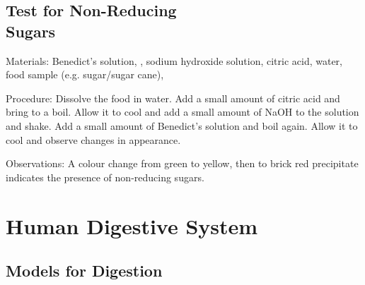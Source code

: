 \begin{multicols}{2}
\subsection[Test for Non-Reducing Sugars]{Test for Non-Reducing \hfill \\ Sugars}


\begin{description*}
\item[Materials:]{Benedict's solution, , sodium hydroxide solution, citric acid, water, food sample (e.g. sugar/sugar cane), }
\item[Procedure:]{Dissolve the food in water. Add a small amount of citric acid and bring to a boil. Allow it to cool and add a small amount of NaOH to the solution and shake. Add a small amount of Benedict's solution and boil again. Allow it to cool and observe changes in appearance.}
\item[Observations:]{A colour change from green to yellow, then to brick red precipitate indicates the presence of non-reducing sugars.}
\end{description*}

\columnbreak


\section*{Human Digestive System}


\subsection{Models for Digestion} %


\end{multicols}
